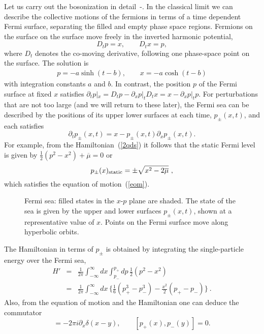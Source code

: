 Let us carry out the bosonization in
detail~\cite{DJcol}-\cite{Wclass}.  In the classical limit we can
describe the collective motions of the fermions in terms of a time
dependent Fermi surface, separating the filled and empty phase space
regions.  Fermions on the surface on the surface move freely in the
inverted harmonic potential, \begin{equation}
D_t p = x, \qquad D_t x = p, \label{ihoem}
\end{equation}
where $D_t$ denotes the co-moving derivative, following one
phase-space point on the surface.  The solution is
\begin{eqnarray}
p = - a \sinh (t - b), \qquad x = -a \cosh (t - b)
\end{eqnarray}
with integration constants $a$ and $b$.  In contrast, the position
$p$ of the Fermi surface at fixed $x$ satisfies $\partial_t p|_x =
D_t p - \partial_x p|_t D_t x = x - \partial_x p|_t p$.  For
perturbations that are not too large (and we will return to these
later), the Fermi sea can be described by the positions of its
upper lower surfaces at each time, $p_\pm(x,t)$, and each satisfies
\begin{equation}
\partial_t p_{\pm}(x,t) = x - p_\pm(x,t) \partial_x p_\pm(x,t).
\label{eom}
\end{equation}
For example, from the Hamiltonian~(\ref{2qds}) it follows that the
static Fermi level is given by $\frac{1}{2}(p^2 - x^2) + \overline
\mu = 0$ or
\begin{equation}
p_{\pm}(x)_{\rm static} = \pm \sqrt{x^2 - 2\overline\mu}\ ,
\label{statlev}
\end{equation}
which satisfies the equation of motion~(\ref{eom}).
\begin{figure}
\begin{center}
\leavevmode
{}
\end{center}
\caption[]{Fermi sea: filled states in the $x$-$p$ plane are
shaded.  The state of the sea is given by the upper and lower
surfaces $p_{\pm}(x,t)$, shown at a representative value of $x$.
Points on the Fermi surface move along
hyperbolic orbits.}
\end{figure}
The Hamiltonian in terms of $p_\pm$ is obtained by integrating
the single-particle energy over the Fermi sea,
\begin{eqnarray}
H' &=& \frac{1}{2\pi} \int_{-\infty}^\infty dx
\int_{p_-}^{p_+} dp\, \frac{1}{2} (p^2 - x^2) \nonumber\\
&=& \frac{1}{2\pi}\int_{-\infty}^\infty dx\,
\biggl\{ \frac{1}{6}(p_+^3 - p_-^3)
-\frac{x^2}{2}(p_+ - p_-) \biggr\}\ . \label{ham}
\end{eqnarray}
Also, from the equation of motion and the Hamiltonian one
can deduce the commutator
\begin{equation}
[ p_\pm(x), p_\pm(y) ]  = - 2\pi i \partial_x \delta(x-y),
\qquad [ p_+(x), p_-(y) ] = 0.
\end{equation}

